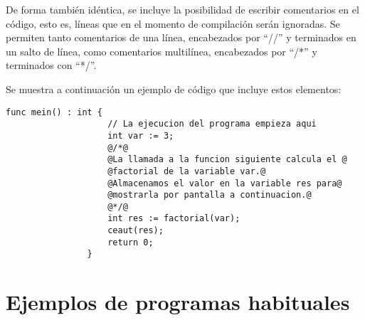 \documentclass[10pt,a4paper]{article}
\begin{document}
De forma también idéntica, se incluye la posibilidad de escribir comentarios en el código, esto es, líneas que en el momento de compilación serán ignoradas. Se permiten tanto comentarios de una línea, encabezados por ``//'' y terminados en un salto de línea, como comentarios multilínea, encabezados por ``/*'' y terminados con ``*/''.

Se muestra a continuación un ejemplo de código que incluye estos elementos:

\begin{center}
    \begin{minipage}{\linewidth}
        \begin{lstlisting}[linewidth=0.7\linewidth, gobble=16]
                func mein() : int {
                    // La ejecucion del programa empieza aqui
                    int var := 3;
                    @/*@
                    @La llamada a la funcion siguiente calcula el @
                    @factorial de la variable var.@
                    @Almacenamos el valor en la variable res para@
                    @mostrarla por pantalla a continuacion.@
                    @*/@
                    int res := factorial(var);
                    ceaut(res);
                    return 0;
                }
        \end{lstlisting}
    \end{minipage}
\end{center}

\newpage
\appendix

\section{Ejemplos de programas habituales}






\end{document}
